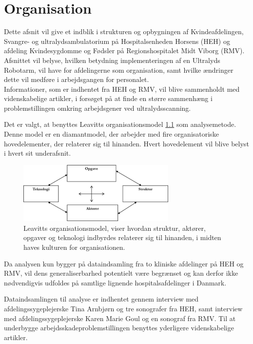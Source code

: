 \chapter{Organisation}
Dette afsnit vil give et indblik i strukturen og opbygningen af Kvindeafdelingen, Svangre- og ultralydsambulatorium på Hospitalsenheden Horsens (HEH) og afdeling Kvindesygdomme og Fødsler på Regionshospitalet Midt Viborg (RMV). Afsnittet vil belyse, hvilken betydning implementeringen af en Ultralyds Robotarm, vil have for afdelingerne som organisation, samt hvilke ændringer dette vil medføre i arbejdsgangen for personalet. \\
Informationer, som er indhentet fra HEH og RMV, vil blive sammenholdt med videnskabelige artikler, i forsøget på at finde en større sammenhæng i problemstillingen omkring arbejdsgener ved ultralydsscanning. 

Det er valgt, at benyttes Leavitts organisationsmodel \ref{DiamantModel} som analysemetode. Denne model er en diamantmodel, der arbejder med fire organisatoriske hovedelementer, der relaterer sig til hinanden. Hvert hovedelement vil blive belyst i hvert sit underafsnit. \cite{Leavitt} \cite{diamantmodel} 

\begin{figure}[h!]\centering
	\includegraphics[width = 0.7\textwidth]{Figurer/LeavittModel}
	\caption{Leavitts organisationsmodel, viser hvordan struktur, aktører, opgaver og teknologi indbyrdes relaterer sig til hinanden, i midten haves kulturen for organisationen. \cite{diamantmodel}}
	\label{DiamantModel}
\end{figure}

Da analysen kun bygger på dataindsamling fra to kliniske afdelinger på HEH og RMV, vil dens generaliserbarhed potentielt være begrænset og kan derfor ikke nødvendigvis udfoldes på samtlige lignende hospitalsafdelinger i Danmark. 

Dataindsamlingen til analyse er indhentet gennem interview med afdelingssygeplejerske Tina Arnbjørn og tre sonografer fra HEH, samt interview med afdelingssygeplejerske Karen Marie Goul og en sonograf fra RMV.
Til at underbygge arbejdsskadeproblemstillingen benyttes yderligere videnskabelige artikler.

